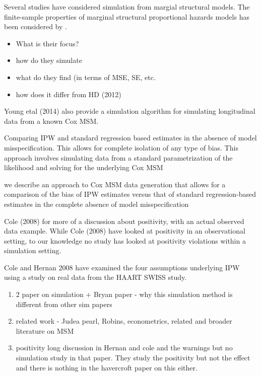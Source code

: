 \documentclass[11pt]{article}
\providecommand{\tightlist}{%
      \setlength{\itemsep}{0pt}\setlength{\parskip}{0pt}}
\begin{document}
Several studies have considered simulation from margial structural
models. The finite-sample properties of marginal structural proportional
hazards models has been considered by \citet{Westreich2009}.

\begin{itemize}
\tightlist
\item
  What is their focus?
\item
  how do they simulate
\item
  what do they find (in terms of MSE, SE, etc.
\item
  how does it differ from HD (2012)
\end{itemize}

Young etal (2014) also provide a simulation algorithm for simulating
longitudinal data from a known Cox MSM.

Comparing IPW and standard regression based estimates in the absence of
model misspecification. This allows for complete isolation of any type
of bias. This approach involves simulating data from a standard
parametrization of the likelihood and solving for the underlying Cox MSM

we describe an approach to Cox MSM data generation that allows for a
comparison of the bias of IPW estimates versus that of standard
regression-based estimates in the complete absence of model
misspecification

Cole (2008) for more of a discussion about positivity, with an actual
observed data example. While Cole (2008) have looked at positivity in an
observational setting, to our knowledge no study has looked at
positivity violations within a simulation setting.

Cole and Hernan 2008 have examined the four assumptions underlying IPW
using a study on real data from the HAART SWISS study.

\begin{enumerate}
\def\labelenumi{\arabic{enumi}.}
\tightlist
\item
  2 paper on simulation + Bryan paper - why this simulation method is
  different from other sim papers
\item
  related work - Judea pearl, Robins, econometrics, related and broader
  literature on MSM
\item
  positivity long discussion in Hernan and cole and the warnings but no
  simulation study in that paper. They study the positivity but not the
  effect and there is nothing in the havercroft paper on this either.
\end{enumerate}
\end{document}
